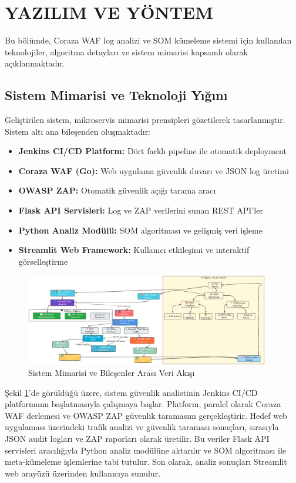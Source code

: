 \section{YAZILIM VE YÖNTEM}

Bu bölümde, Coraza WAF log analizi ve SOM kümeleme sistemi için kullanılan teknolojiler, algoritma detayları ve sistem mimarisi kapsamlı olarak açıklanmaktadır.

\subsection{Sistem Mimarisi ve Teknoloji Yığını}

Geliştirilen sistem, mikroservis mimarisi prensipleri gözetilerek tasarlanmıştır. Sistem altı ana bileşenden oluşmaktadır:

\begin{itemize}
    \item \textbf{Jenkins CI/CD Platform:} Dört farklı pipeline ile otomatik deployment
    \item \textbf{Coraza WAF (Go):} Web uygulama güvenlik duvarı ve JSON log üretimi
    \item \textbf{OWASP ZAP:} Otomatik güvenlik açığı tarama aracı
    \item \textbf{Flask API Servisleri:} Log ve ZAP verilerini sunan REST API'ler
    \item \textbf{Python Analiz Modülü:} SOM algoritması ve gelişmiş veri işleme
    \item \textbf{Streamlit Web Framework:} Kullanıcı etkileşimi ve interaktif görselleştirme
\end{itemize}

\begin{figure}[!ht]
    \centering
    \includegraphics[width=0.95\textwidth]{images/uygulama-mimari-sablonu2.png}
    \caption{Sistem Mimarisi ve Bileşenler Arası Veri Akışı}
    \label{fig:system_architecture}
\end{figure}

Şekil \ref{fig:system_architecture}'de görüldüğü üzere, sistem güvenlik analistinin Jenkins CI/CD platformunu başlatmasıyla çalışmaya başlar. Platform, paralel olarak Coraza WAF derlemesi ve OWASP ZAP güvenlik taramasını gerçekleştirir. Hedef web uygulaması üzerindeki trafik analizi ve güvenlik taraması sonuçları, sırasıyla JSON audit logları ve ZAP raporları olarak üretilir. Bu veriler Flask API servisleri aracılığıyla Python analiz modülüne aktarılır ve SOM algoritması ile meta-kümeleme işlemlerine tabi tutulur. Son olarak, analiz sonuçları Streamlit web arayüzü üzerinden kullanıcıya sunulur.

